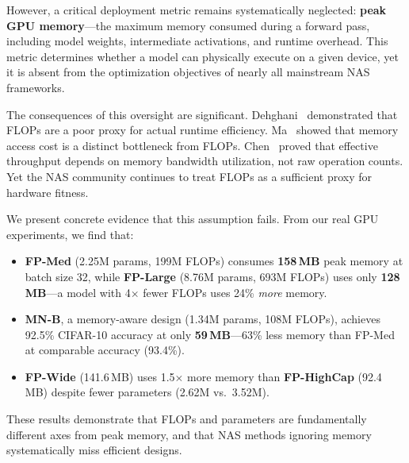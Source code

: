 \documentclass[10pt,twocolumn,letterpaper]{article}
\begin{document}
However, a critical deployment metric remains systematically neglected: \textbf{peak GPU memory}---the maximum memory consumed during a forward pass, including model weights, intermediate activations, and runtime overhead. This metric determines whether a model can physically execute on a given device, yet it is absent from the optimization objectives of nearly all mainstream NAS frameworks.

The consequences of this oversight are significant. Dehghani~\etal\cite{dehghani2022efficiency} demonstrated that FLOPs are a poor proxy for actual runtime efficiency. Ma~\etal\cite{ma2018shufflenetv2} showed that memory access cost is a distinct bottleneck from FLOPs. Chen~\etal\cite{chen2023run} proved that effective throughput depends on memory bandwidth utilization, not raw operation counts. Yet the NAS community continues to treat FLOPs as a sufficient proxy for hardware fitness.

We present concrete evidence that this assumption fails. From our real GPU experiments, we find that:
\begin{itemize}[leftmargin=*,nosep]
    \item \textbf{FP-Med} (2.25M params, 199M FLOPs) consumes \textbf{158\,MB} peak memory at batch size 32, while \textbf{FP-Large} (8.76M params, 693M FLOPs) uses only \textbf{128\,MB}---a model with 4$\times$ fewer FLOPs uses 24\% \emph{more} memory.
    \item \textbf{MN-B}, a memory-aware design (1.34M params, 108M FLOPs), achieves 92.5\% CIFAR-10 accuracy at only \textbf{59\,MB}---63\% less memory than FP-Med at comparable accuracy (93.4\%).
    \item \textbf{FP-Wide} (141.6\,MB) uses 1.5$\times$ more memory than \textbf{FP-HighCap} (92.4\,MB) despite fewer parameters (2.62M vs.\ 3.52M).
\end{itemize}

These results demonstrate that FLOPs and parameters are fundamentally different axes from peak memory, and that NAS methods ignoring memory systematically miss efficient designs.
\end{document}
